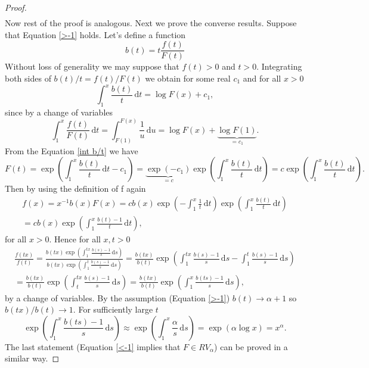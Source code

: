 \documentclass[english,12pt,a4paper,pdftex,sci,utf8]{aaltothesis} %
\begin{document}
\begin{proof}
\begin{equation*}
\begin{split}
\end{split}
\end{equation*}
Now rest of the proof is analogous. Next we prove the converse results. Suppose that Equation \eqref{>-1} holds. Let's define a function
\begin{equation*}
b(t) = t\frac{f(t)}{F(t)}
\end{equation*}
Without loss of generality we may suppose that $f(t)>0$ and $t>0$. Integrating both sides of $b(t)/t=f(t)/F(t)$ we obtain for some real $c_1$ and for all $x>0$
\begin{equation}
\int_{1}^{x} \frac{b(t)}{t}\,\mathrm{d}t = \log F(x) + c_1,
\label{int b/t}
\end{equation}
since by a change of variables
\begin{equation*}
\int_{1}^{x} \frac{f(t)}{F(t)}\,\mathrm{d}t = \int_{F(1)}^{F(x)} \frac{1}{u}\,\mathrm{d}u = \log F(x) + \underbrace{\log F(1)}_{=c_1}.
\end{equation*}
From the Equation \eqref{int b/t} we have
\begin{equation*}
F(t) = \exp \left( \int_1^x \frac{b(t)}{t}\,\mathrm{d}t-c_1 \right) =\underbrace{\exp(-c_1)}_{=c} \exp \left( \int_1^x \frac{b(t)}{t}\,\mathrm{d}t\right) =c \exp \left( \int_1^x \frac{b(t)}{t}\,\mathrm{d}t\right).
\end{equation*}
Then by using the definition of f again
\begin{equation}
\begin{split}
f(x)=x^{-1}b(x)F(x)=cb(x)\exp \left( -\int_1^x \frac{1}{t} \,\mathrm{d}t\right) \exp \left( \int_1^x \frac{b(t)}{t} \,\mathrm{d}t\right)\\
=cb(x)\exp \left( \int_1^x \frac{b(t)-1}{t}\,\mathrm{d}t\right),
\label{frep}
\end{split}
\end{equation}
for all $x>0$. Hence for all $x,t>0$
\begin{equation*}
\begin{split}
\frac{f(tx)}{f(t)}=\frac{b(tx)\exp \left( \int_1^{tx} \frac{b(s)-1}{s}\,\mathrm{d}s\right)}{b(tx)\exp \left( \int_1^{t} \frac{b(s)-1}{s}\,\mathrm{d}s\right)} = \frac{b(tx)}{b(t)} \exp \left( \int_1^{tx} \frac{b(s)-1}{s}\,\mathrm{d}s - \int_1^{t} \frac{b(s)-1}{s}\,\mathrm{d}s\right) \\
= \frac{b(tx)}{b(t)} \exp \left( \int_{t}^{tx} \frac{b(s)-1}{s}\,\mathrm{d}s\right)
= \frac{b(tx)}{b(t)} \exp \left( \int_{1}^{x} \frac{b(ts)-1}{s}\,\mathrm{d}s\right),
\end{split}
\end{equation*}
by a change of variables. By the assumption (Equation \eqref{>-1}) $b(t) \rightarrow \alpha + 1$ so $b(tx)/b(t) \rightarrow 1$. For sufficiently large $t$
\begin{equation*}
\exp \left( \int_{1}^{x} \frac{b(ts)-1}{s}\,\mathrm{d}s\right) \approx \exp \left( \int_{1}^{x} \frac{\alpha}{s}\,\mathrm{d}s\right)=\exp \left(\alpha \log x \right) = x^{\alpha}.
\end{equation*}
The last statement (Equation \eqref{<-1} implies that $F \in RV_{\alpha}$) can be proved in a similar way.
\end{proof}
\end{document}
